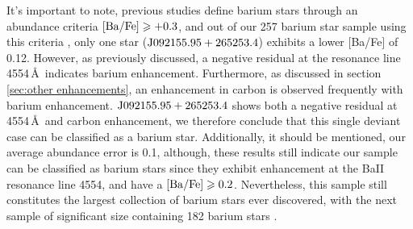 \documentclass[a4paper,fleqn,usenatbib]{mnras}
\begin{document}
It's important to note, previous studies \citet{malaney1988} define barium stars through an abundance criteria $\rm[Ba/Fe]\geq +0.3$, and out of our 257 barium star sample using this criteria , only one star ($\rm J092155.95+265253.4$) exhibits a lower [Ba/Fe] of 0.12. However, as previously discussed, a negative residual at the  resonance line 4554\,\AA\, indicates barium enhancement. Furthermore, as discussed in section \ref{sec:other enhancements}, an enhancement in carbon is observed frequently with barium enhancement. $\rm J092155.95+265253.4$ shows both a negative residual at 4554\,\AA\, and carbon enhancement, we therefore conclude that this single deviant case can be classified as a barium star. Additionally, it should be mentioned, our average abundance error is 0.1, although, these results still indicate our sample can be classified as barium stars since they exhibit enhancement at the BaII resonance line 4554, and have a $\rm[Ba/Fe] \geq 0.2$. Nevertheless, this sample still constitutes the largest collection of barium stars ever discovered, with the next sample of significant size containing 182 barium stars \citep[e.g.,][]{decastro2016}.
\end{document}
